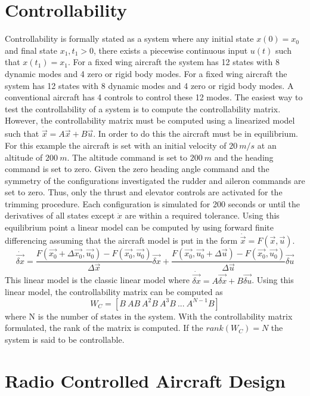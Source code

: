 \documentclass{article}
\begin{document}
\section{Controllability}

Controllability is formally stated as a system where any initial
state $x(0)=x_0$ and final state $x_1,t_1>0$, there exists a piecewise
continuous input $u(t)$ such that $x(t_1)=x_1$. 
For a fixed wing aircraft the system has 12 states with 8 dynamic
modes and 4 zero or rigid body modes. For a fixed wing aircraft the system has 12 states with 8 dynamic
modes and 4 zero or rigid body modes. A conventional aircraft has 4
controls to control these 12 modes. The easiest way to test the 
controllability of a system  is to compute the
controllability matrix. However, the controllability matrix must be
computed using a linearized model such that
$\dot{\vec{x}}=A\vec{x}+B\vec{u}$. In order to do this the aircraft
must be in equilibrium. For this example the aircraft is
set with an initial velocity of $20~m/s$ at an altitude of
$200~m$. The altitude command is set to $200~m$ and the heading
command is set to zero. Given the zero heading angle command and the
symmetry of the configurations investigated the rudder and aileron
commands are set to zero. Thus, only the thrust and elevator controls
are activated for the trimming procedure. Each configuration is
simulated for 200 seconds or until the derivatives of all states
except $\dot{x}$ are within a required tolerance. Using this
equilibrium point a linear model can be computed by using forward
finite differencing assuming that the
aircraft model is put in the form $\dot{\vec{x}} = F(\vec{x},\vec{u})$.
\begin{equation}
\dot{\vec{\delta x}} = \frac{F(\vec{x_0}+\Delta \vec{x_0},\vec{u_0})-F(\vec{x_0},\vec{u_0})}{\Delta
  \vec{x}}\vec{\delta x} + \frac{F(\vec{x_0},\vec{u_0}+\Delta
  \vec{u})-F(\vec{x_0},\vec{u_0})}{\Delta \vec{u}}\vec{\delta u}
\end{equation}
This linear model is the classic linear model where
$\dot{\vec{\delta x}}=A\vec{\delta{x}}+B\vec{\delta{u}}$. Using this linear model, the
controllability matrix can be computed as
\begin{equation}
W_C = [B~AB~A^2B~A^3B~...~A^{N-1}B]
\end{equation}
where N is the number of states in the system. With the controllability
matrix formulated, the rank of the matrix is computed. If the
$rank(W_C)=N$ the system is said to be controllable.

\section{Radio Controlled Aircraft Design}
\end{document}
